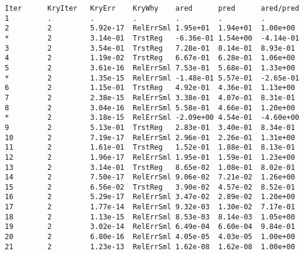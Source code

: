 \begin{lstlisting}[style=OptizelleOutput,caption={Optizelle generates this output when running the Rosenbrock example in Listing \ref{lst:Rosen}.  We explain this output in Chapter \ref{ch:Output}.},label=lst:RosenOut]
Iter      KryIter   KryErr    KryWhy    ared      pred      ared/pred 
1         .         .         .         .         .         .         
2         2         5.92e-17  RelErrSml 1.95e+01  1.94e+01  1.00e+00  
*         2         3.14e-01  TrstReg   -6.36e-01 1.54e+00  -4.14e-01 
3         2         3.54e-01  TrstReg   7.28e-01  8.14e-01  8.93e-01  
4         2         1.19e-02  TrstReg   6.67e-01  6.28e-01  1.06e+00  
5         2         3.61e-16  RelErrSml 7.53e-01  5.68e-01  1.33e+00  
*         2         1.35e-15  RelErrSml -1.48e-01 5.57e-01  -2.65e-01 
6         2         1.15e-01  TrstReg   4.92e-01  4.36e-01  1.13e+00  
7         2         2.38e-15  RelErrSml 3.38e-01  4.07e-01  8.31e-01  
8         2         3.04e-16  RelErrSml 5.58e-01  4.66e-01  1.20e+00  
*         2         3.18e-15  RelErrSml -2.09e+00 4.54e-01  -4.60e+00 
9         2         5.13e-01  TrstReg   2.83e-01  3.40e-01  8.34e-01  
10        2         7.19e-17  RelErrSml 2.96e-01  2.26e-01  1.31e+00  
11        2         1.61e-01  TrstReg   1.52e-01  1.88e-01  8.13e-01  
12        2         1.96e-17  RelErrSml 1.95e-01  1.59e-01  1.23e+00  
13        2         3.14e-01  TrstReg   8.65e-02  1.08e-01  8.02e-01  
14        2         7.50e-17  RelErrSml 9.06e-02  7.21e-02  1.26e+00  
15        2         6.56e-02  TrstReg   3.90e-02  4.57e-02  8.52e-01  
16        2         5.29e-17  RelErrSml 3.47e-02  2.89e-02  1.20e+00  
17        2         1.77e-14  RelErrSml 9.32e-03  1.30e-02  7.17e-01  
18        2         1.13e-15  RelErrSml 8.53e-03  8.14e-03  1.05e+00  
19        2         3.02e-14  RelErrSml 6.49e-04  6.60e-04  9.84e-01  
20        2         6.80e-16  RelErrSml 4.05e-05  4.03e-05  1.00e+00  
21        2         1.23e-13  RelErrSml 1.62e-08  1.62e-08  1.00e+00
\end{lstlisting}
